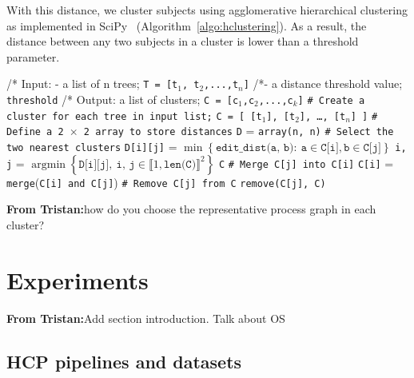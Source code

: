 \documentclass[a4paper,num-refs]{oup-contemporary}
\DeclareMathOperator*{\argmin}{argmin}
\newcommand{\tristan}[1]{\color{blue}\textbf{From Tristan:}#1\color{black}}
\begin{document}
With this distance, we cluster subjects using agglomerative hierarchical
clustering as implemented in SciPy~\cite{oliphant2007scipy}
(Algorithm~\ref{algo:hclustering}). As a result, the distance between
any two subjects in a cluster is lower than a threshold parameter.

\begin{algorithm}[h!]
\caption{Hierarchical clustering algorithm from SciPy}
\label{algo:hclustering}
\begin{algorithmic}

  \State /* Input: - a list of n trees; \texttt{T = [t${_1}$, t${_2}$,...,t${_n}$]}
  \State /*\quad \quad \quad \quad - a distance threshold value; \texttt{threshold}
  \State /* Output: a list of clusters; \texttt{C = [c${_1}$,c${_2}$,...,c${_k}$]}
  \State \texttt{\# Create a cluster for each tree in input list;}
  \State \texttt{C = [ [t${_1}$], [t${_2}$], \ldots , [t${_n}$] ]}
  \State \texttt{\# Define a 2 $\times$ 2 array to store distances}
  \State \texttt{D} = \texttt{array(n, n)}
  \State \texttt{\# Select the two nearest clusters}
  \State \texttt{D[i][j]} = $\min \left\{ \texttt{edit\_dist(a, b)}: \ \texttt{a} \in \texttt{C[i]}, \texttt{b} \in \texttt{C[j]} \right\}$
    \EndFor
  \EndFor
  \State \texttt{i, j} = $\argmin \left\{ \texttt{D[i][j]}, \ \texttt{i, j} \in \llbracket 1, \texttt{len(C)}\rrbracket^2 \right\}$
  \State \Return \texttt{C}
  \Else
  \State \texttt{\# Merge C[j] into C[i]}
  \State \texttt{C[i]} = \texttt{merge}(\texttt{C[i] and C[j]})
  \State \texttt{\# Remove C[j] from C}
  \State \texttt{remove(C[j], C)}
  \EndIf
  \EndWhile
\end{algorithmic}
\end{algorithm}

\tristan{how do you choose the representative process graph in each cluster?}

\section{Experiments}

\tristan{Add section introduction. Talk about OS}

\subsection{HCP pipelines and datasets}
\end{document}
